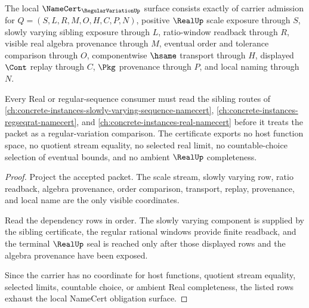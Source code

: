 \begin{theorem}
\label{thm:regular-variation-namecert}
The local $\NameCert_{\RegularVariationUp}$ surface consists exactly of carrier admission for $Q=(S,L,R,M,O,H,C,P,N)$, positive $\RealUp$ scale exposure through $S$, slowly varying sibling exposure through $L$, ratio-window readback through $R$, visible real algebra provenance through $M$, eventual order and tolerance comparison through $O$, componentwise $\hsame$ transport through $H$, displayed $\Cont$ replay through $C$, $\Pkg$ provenance through $P$, and local naming through $N$.

Every Real or regular-sequence consumer must read the sibling routes of \autoref{ch:concrete-instances-slowly-varying-sequence-namecert}, \autoref{ch:concrete-instances-regseqrat-namecert}, and \autoref{ch:concrete-instances-real-namecert} before it treats the packet as a regular-variation comparison. The certificate exports no host function space, no quotient stream equality, no selected real limit, no countable-choice selection of eventual bounds, and no ambient $\RealUp$ completeness.
\end{theorem}
\begin{proof}
Project the accepted packet. The scale stream, slowly varying row, ratio readback, algebra provenance, order comparison, transport, replay, provenance, and local name are the only visible coordinates.

Read the dependency rows in order. The slowly varying component is supplied by the sibling certificate, the regular rational windows provide finite readback, and the terminal $\RealUp$ seal is reached only after those displayed rows and the algebra provenance have been exposed.

Since the carrier has no coordinate for host functions, quotient stream equality, selected limits, countable choice, or ambient Real completeness, the listed rows exhaust the local NameCert obligation surface.
\end{proof}


